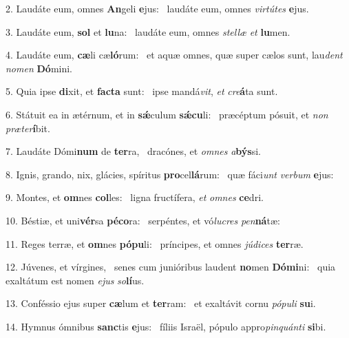 2. Laudáte eum, omnes \textbf{An}geli \textbf{e}jus: \ast\  laudáte eum, omnes \textit{vir}\textit{tú}\textit{tes} \textbf{e}jus.\

3. Laudáte eum, \textbf{sol} et \textbf{lu}na: \ast\  laudáte eum, omnes \textit{stel}\textit{læ} \textit{et} \textbf{lu}men.\

4. Laudáte eum, \textbf{cæ}li cæ\textbf{ló}rum: \ast\  et aquæ omnes, quæ super cælos sunt, lau\textit{dent} \textit{no}\textit{men} \textbf{Dó}mini.\

5. Quia ipse \textbf{di}xit, et \textbf{fac}\textbf{ta} sunt: \ast\  ipse mandá\textit{vit}, \textit{et} \textit{cre}\textbf{á}ta sunt.\

6. Státuit ea in ætérnum, et in \textbf{sǽ}culum \textbf{sǽ}\textbf{cu}li: \ast\  præcéptum pósuit, et \textit{non} \textit{præ}\textit{ter}\textbf{í}bit.\

7. Laudáte Dómi\textbf{num} de \textbf{ter}ra, \ast\  dracónes, et \textit{om}\textit{nes} \textit{a}\textbf{býs}si.\

8. Ignis, grando, nix, glácies, spíritus \textbf{pro}cel\textbf{lá}rum: \ast\  quæ fáci\textit{unt} \textit{ver}\textit{bum} \textbf{e}jus:\

9. Montes, et \textbf{om}nes \textbf{col}les: \ast\  ligna fructífera, \textit{et} \textit{om}\textit{nes} \textbf{ce}dri.\

10. Béstiæ, et uni\textbf{vér}sa \textbf{pé}\textbf{co}ra: \ast\  serpéntes, et vó\textit{lu}\textit{cres} \textit{pen}\textbf{ná}tæ:\

11. Reges terræ, et \textbf{om}nes \textbf{pó}\textbf{pu}li: \ast\  príncipes, et omnes \textit{jú}\textit{di}\textit{ces} \textbf{ter}ræ.\

12. Júvenes, et vírgines, \dag\  senes cum junióribus laudent \textbf{no}men \textbf{Dó}\textbf{mi}ni: \ast\  quia exaltátum est nomen \textit{e}\textit{jus} \textit{so}\textbf{lí}us.\

13. Conféssio ejus super \textbf{cæ}lum et \textbf{ter}ram: \ast\  et exaltávit cornu \textit{pó}\textit{pu}\textit{li} \textbf{su}i.\

14. Hymnus ómnibus \textbf{sanc}tis \textbf{e}jus: \ast\  fíliis Israël, pópulo appro\textit{pin}\textit{quán}\textit{ti} \textbf{si}bi.\

